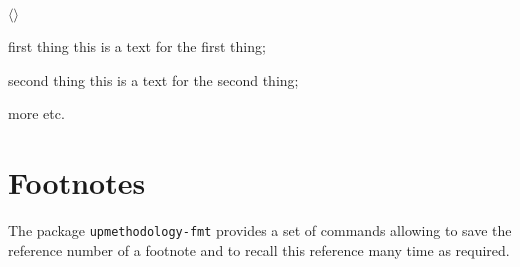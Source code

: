 \documentclass[book,taskpackage,specpackage,codepackage]{upmethodology-document}
\begin{document}
\begin{enumdescriptionx}[a]{$\langle$}{$\rangle$}
\item[first thing] this is a text for the first thing;
\item[second thing] this is a text for the second thing;
\item[more] etc.
\end{enumdescriptionx}


\section{Footnotes}

The package \texttt{upmethodology-fmt} provides a set of commands allowing to save the reference number of a footnote and to recall this reference many time as required.
\end{document}
